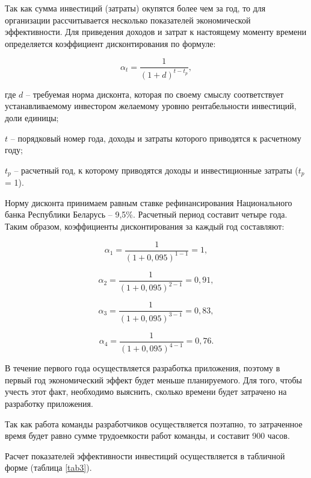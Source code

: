 Так как сумма инвестиций (затраты) окупятся более чем за год, то для организации рассчитывается несколько показателей экономической эффективности. Для приведения доходов и затрат к настоящему моменту времени определяется коэффициент дисконтирования по формуле:

\begin{equation}
    \alpha _{t} = \frac{1}{(1 + d)^{t - t_p}}, 
\end{equation}

где $d$ -- требуемая норма дисконта, которая по своему смыслу 
соответствует устанавливаемому инвестором желаемому уровню   
рентабельности инвестиций, доли единицы;

$t$ – порядковый номер года, доходы и затраты которого приводятся к расчетному году;

$t_p$ – расчетный год, к которому приводятся доходы и инвестиционные затраты ($t_p$ = 1). 

Норму дисконта принимаем равным ставке рефинансирования Национального банка Республики Беларусь – 9,5\%. Расчетный период составит четыре года. Таким образом, коэффициенты дисконтирования за каждый год составляют:

$$
    \alpha _{1} = \frac{1}{(1 + 0,095)^{1-1}} =  1,
$$

$$
    \alpha _{2} = \frac{1}{(1 + 0,095)^{2-1}} =  0,91,
$$

$$
    \alpha _{3} = \frac{1}{(1 + 0,095)^{3-1}} =  0,83,
$$

$$
    \alpha _{4} = \frac{1}{(1 + 0,095)^{4-1}} =  0,76.
$$

В течение первого года осуществляется разработка приложения, поэтому в первый год экономический эффект будет меньше планируемого. Для того, чтобы учесть этот факт, необходимо выяснить, сколько времени будет затрачено на разработку приложения.

Так как работа команды разработчиков осуществляется поэтапно, то затраченное время будет равно сумме трудоемкости работ команды, и составит 900 часов.


Расчет показателей эффективности инвестиций осуществляется в табличной форме (таблица \ref{tab3}).

